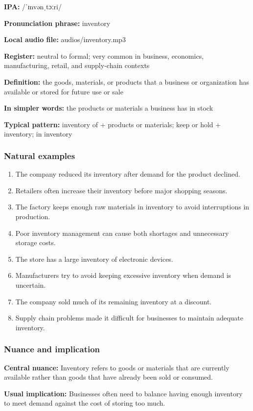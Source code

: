 \documentclass[11pt]{article}
\begin{document}
\textbf{IPA:} /ˈɪnvənˌtɔːri/

\textbf{Pronunciation phrase:} inventory

\textbf{Local audio file:} audios/inventory.mp3

\textbf{Register:} neutral to formal; very common in business, economics, manufacturing, retail, and supply-chain contexts

\textbf{Definition:} the goods, materials, or products that a business or organization has available or stored for future use or sale

\textbf{In simpler words:} the products or materials a business has in stock

\textbf{Typical pattern:} inventory of + products or materials; keep or hold + inventory; in inventory

\subsubsection{Natural examples}
\begin{enumerate}
  \item The company reduced its inventory after demand for the product declined.
  \item Retailers often increase their inventory before major shopping seasons.
  \item The factory keeps enough raw materials in inventory to avoid interruptions in production.
  \item Poor inventory management can cause both shortages and unnecessary storage costs.
  \item The store has a large inventory of electronic devices.
  \item Manufacturers try to avoid keeping excessive inventory when demand is uncertain.
  \item The company sold much of its remaining inventory at a discount.
  \item Supply chain problems made it difficult for businesses to maintain adequate inventory.
\end{enumerate}

\subsubsection{Nuance and implication}
\textbf{Central nuance:} Inventory refers to goods or materials that are currently available rather than goods that have already been sold or consumed.

\textbf{Usual implication:} Businesses often need to balance having enough inventory to meet demand against the cost of storing too much.
\end{document}
